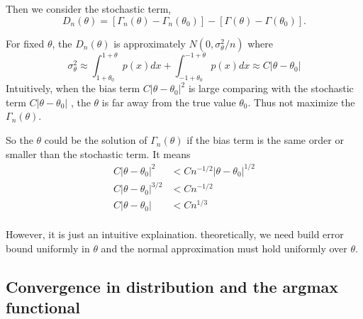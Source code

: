 Then we consider the stochastic term,
$$
D_n(\theta)=\left[\Gamma_n(\theta)-\Gamma_n\left(\theta_0\right)\right]-\left[\Gamma(\theta)-\Gamma\left(\theta_0\right)\right] .
$$

For fixed $\theta$,
the $D_n(\theta)$ is approximately $N(0,\sigma^2_\theta/n)$
where
$$
\sigma_\theta^2 \approx \int_{1+\theta_0}^{1+\theta} p(x) d x+\int_{-1+\theta_0}^{-1+\theta} p(x) d x \approx C\left|\theta-\theta_0\right|
$$
Intuitively, when the bias term $C|\theta - \theta_0|^2$  is large comparing with the stochastic term $C|\theta - \theta_0|$ , the $\theta$ is far away from the true value $\theta_0$.
Thus not maximize the $\Gamma_n(\theta)$.

So the $\theta$ could be the solution of $\Gamma_n(\theta)$ if the bias term is the same order or smaller than the stochastic term.
It means 
\begin{align*}
  C|\theta - \theta_0|^2 &< C n^{-1/2}|\theta - \theta_0|^{1/2} \\
  C|\theta - \theta_0|^{3/2} &< C n^{-1/2} \\
  C|\theta - \theta_0| &< C n^{1/3} \\
\end{align*}

\begin{summary}
  However, it is just an intuitive explaination.
  theoretically, we need build error bound uniformly in $\theta$ and the normal approximation must hold uniformly over $\theta$.
\end{summary}



\subsection{Convergence in distribution and the argmax functional}